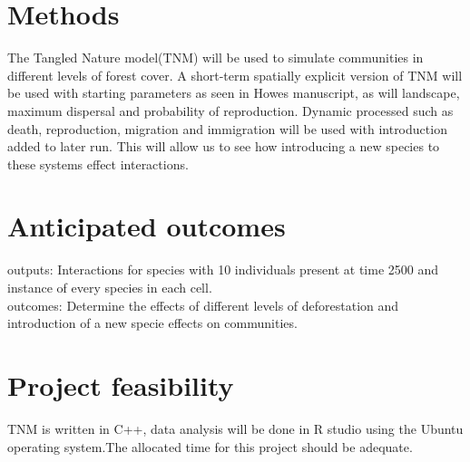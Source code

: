 \documentclass[11pt]{article}
\begin{document}
\section{Methods}

The Tangled Nature model(TNM) will be used to simulate communities in different levels of forest cover. A short-term spatially explicit version of TNM will be used with starting parameters as seen in Howes manuscript, as will landscape, maximum dispersal and probability of reproduction. Dynamic processed such as death, reproduction, migration and immigration will be used with introduction added to later run. This will allow us to see how introducing a new species to these systems effect interactions.

\section{Anticipated outcomes}
outputs: Interactions for species with 10 individuals present at time 2500 and instance of every species in each cell.\\
outcomes: Determine the effects of different levels of deforestation and introduction of a new specie effects on communities. 

\section{Project feasibility }

TNM is written in C++, data analysis will be done in R studio using the Ubuntu operating system.The allocated time for this project should be adequate.


\def\GanttHeader#1#2#3#4{%
 \pgfmathparse{(#1-#2-#3)/#4}
 \linespread{0.5}
 \tikzset{y=10mm, task number/.style={left, font=\bfseries},
     task description/.style={text width=#3,  right, draw=none,
           font=\sffamily, xshift=#2,
           minimum height=2em},
     gantt bar/.style={draw=black, fill=blue!30},
     help lines/.style={draw=black!30, dashed},
     x=\pgfmathresult pt
     }
  \def\totalmonths{#4}
  \node (Header) [task description] at (0,0) {\textbf{\large Task Description Over Each Month}};
  \begin{scope}[shift=($(Header.south east)$)]
    \foreach \x in {1,...,#4}
      \node[above] at (\x,0) {\footnotesize\x};
 \end{scope}
}
\end{document}
